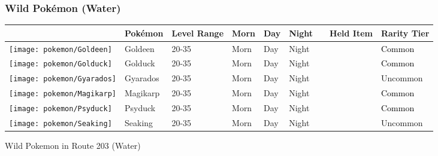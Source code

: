\subsubsection{Wild Pokémon (Water)}%
\label{ssubsec:WildPokmon(Water)}%
\begin{longtable}{||l l l l l l l l l||}%
\hline%
\rowcolor{WaterColor}%
&Pokémon&Level Range&Morn&Day&Night&&Held Item&Rarity Tier\\%
\hline%
\endhead%
\hline%
\rowcolor{WaterColor}%
\texttt{[image: pokemon/Goldeen]}&Goldeen&20{-}35&Morn&Day&Night&&&\textcolor{black}{%
Common%
}\\%
\hline%
\rowcolor{WaterColor}%
\texttt{[image: pokemon/Golduck]}&Golduck&20{-}35&Morn&Day&Night&&&\textcolor{black}{%
Common%
}\\%
\hline%
\rowcolor{WaterColor}%
\texttt{[image: pokemon/Gyarados]}&Gyarados&20{-}35&Morn&Day&Night&&&\textcolor{OliveGreen}{%
Uncommon%
}\\%
\hline%
\rowcolor{WaterColor}%
\texttt{[image: pokemon/Magikarp]}&Magikarp&20{-}35&Morn&Day&Night&&&\textcolor{black}{%
Common%
}\\%
\hline%
\rowcolor{WaterColor}%
\texttt{[image: pokemon/Psyduck]}&Psyduck&20{-}35&Morn&Day&Night&&&\textcolor{black}{%
Common%
}\\%
\hline%
\rowcolor{WaterColor}%
\texttt{[image: pokemon/Seaking]}&Seaking&20{-}35&Morn&Day&Night&&&\textcolor{OliveGreen}{%
Uncommon%
}\\%
\hline%
\end{longtable}%
\caption{Wild Pokemon in Route 203 (Water)}